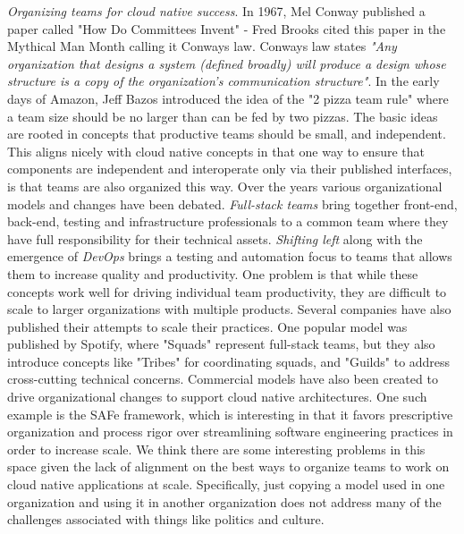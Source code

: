 \documentclass[conference]{IEEEtran}
\begin{document}
\textit{Organizing teams for cloud native success}.  In 1967, Mel Conway published a paper called "How Do Committees Invent" - Fred Brooks cited this paper in the Mythical Man Month\cite{Brooks1975} calling it Conways law\cite{ConwaysLaw}. Conways law states \textit{"Any organization that designs a system (defined broadly) will produce a design whose structure is a copy of the organization's communication structure"}.  In the early days of Amazon, Jeff Bazos introduced the idea of the "2 pizza team rule"\cite{TwoPizza} where a team size should be no larger than can be fed by two pizzas.  The basic ideas are rooted in concepts that productive teams should be small, and independent.  This aligns nicely with cloud native concepts in that one way to ensure that components are independent and interoperate only via their published interfaces, is that teams are also organized this way.  Over the years various organizational models and changes have been debated. \textit{Full-stack teams} bring together front-end, back-end, testing and infrastructure professionals to a common team where they have full responsibility for their technical assets. \textit{Shifting left} along with the emergence of \textit{DevOps} brings a testing and automation focus to teams that allows them to increase quality and productivity.  One problem is that while these concepts work well for driving individual team productivity, they are difficult to scale to larger organizations with multiple products.  Several companies have also published their attempts to scale their practices.  One popular model was published by Spotify\cite{SpotifyModel}, where "Squads" represent full-stack teams, but they also introduce concepts like "Tribes" for coordinating squads, and "Guilds" to address cross-cutting technical concerns. Commercial models have also been created to drive organizational changes to support cloud native architectures.  One such example is the SAFe\cite{SAFeAgile} framework, which is interesting in that it favors prescriptive organization and process rigor over streamlining software engineering practices in order to increase scale. We think there are some interesting problems in this space given the lack of alignment on the best ways to organize teams to work on cloud native applications at scale. Specifically, just copying a model used in one organization and using it in another organization does not address many of the challenges associated with things like politics and culture. 
\end{document}

